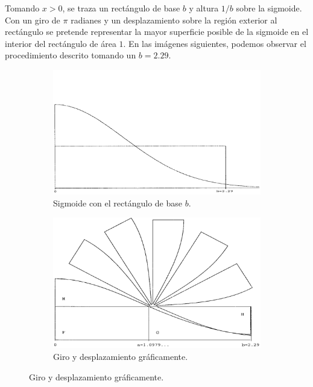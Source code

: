\documentclass[a4paper,12pt]{article}
\begin{document}
	Tomando $x>0$, se traza un rectángulo de base $b$ y altura $1/b$ sobre la sigmoide. Con un giro de $\pi$ radianes y un desplazamiento sobre la región exterior al rectángulo se pretende representar la mayor superficie posible de la sigmoide en el interior del rectángulo de área $1$. En las imágenes siguientes, podemos observar el procedimiento descrito tomando un $b=2.29$.
	\vspace{-1mm}
	\begin{figure}[H]
		\begin{subfigure}{.5\textwidth}
			\centering
			\includegraphics[width=\textwidth]{include/sigmoid_w_square.png}
			\caption{Sigmoide con el rectángulo de base $b$. \cite{monty-python}}
		\end{subfigure}
		\begin{subfigure}{.5\textwidth}
			\centering
			\includegraphics[width=\textwidth]{include/rotating_sigmoid.png}
			\caption{Giro y desplazamiento gráficamente. \cite{monty-python}}
		\end{subfigure}
	\end{figure}
	
\end{document}
